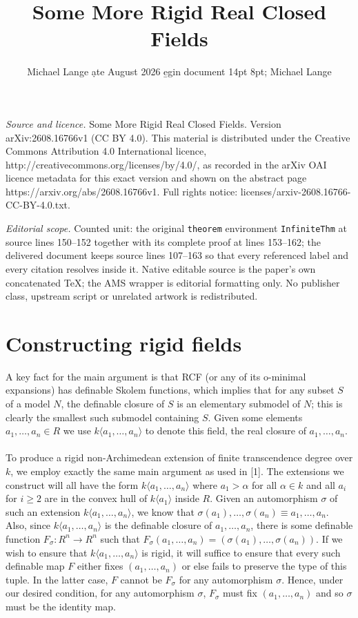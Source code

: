 \documentclass[10pt,a4paper]{amsart}
\begin{document}
\title[Some More Rigid Real Closed Fields]{Some More Rigid Real Closed Fields}
\author{Michael Lange ạte August 2026 e̱gin document 14pt 8pt; Michael Lange}
\date{}
\maketitle
\noindent\emph{Source and licence.} Some More Rigid Real Closed Fields. Version arXiv:2608.16766v1 (CC BY 4.0). This material is distributed under the Creative Commons Attribution 4.0 International licence, http://creativecommons.org/licenses/by/4.0/, as recorded in the arXiv OAI licence metadata for this exact version and shown on the abstract page https://arxiv.org/abs/2608.16766v1. Full rights notice: licenses/arxiv-2608.16766-CC-BY-4.0.txt.\par\smallskip
\noindent\textit{Editorial scope.} Counted unit: the original \texttt{theorem} environment \texttt{InfiniteThm} at source lines 150--152 together with its complete proof at lines 153--162; the delivered document keeps source lines 107--163 so that every referenced label and every citation resolves inside it. Native editable source is the paper's own concatenated TeX; the AMS wrapper is editorial formatting only. No publisher class, upstream script or unrelated artwork is redistributed.
\section{Constructing rigid fields}
A key fact for the main argument is that RCF (or any of its o-minimal expansions) has definable Skolem functions, which implies that for any subset $S$ of a model $N$, the definable closure of $S$ is an elementary submodel of $N$; this is clearly the smallest such submodel containing $S$. Given some elements $a_1,\dots,a_n\in R$ we use $k\langle a_1,\dots,a_n\rangle$ to denote this field, the real closure of $a_1,\dots,a_n$.
\\
\\
To produce a rigid non-Archimedean extension of finite transcendence degree over $k$, we employ exactly the same main argument as used in [1]. The extensions we construct will all have the form $k\langle a_1,\dots, a_n\rangle$ where $a_1>\alpha$ for all $\alpha\in k$ and all $a_i$ for $i\geq 2$ are in the convex hull of $k\langle a_1\rangle$ inside $R$. Given an automorphism $\sigma$ of such an extension $k\langle a_1,\dots, a_n\rangle$, we know that $\sigma(a_1),\dots,\sigma(a_n)\equiv a_1,\dots, a_n$. Also, since $k\langle a_1,\dots, a_n\rangle$ is the definable closure of $a_1,\dots,a_n$, there is some definable function $F_\sigma:R^n\to R^n$ such that $F_\sigma(a_1,\dots,a_n)=(\sigma(a_1),\dots,\sigma(a_n))$. If we wish to ensure that $k\langle a_1,\dots, a_n\rangle$ is rigid, it will suffice to ensure that every such definable map $F$ either fixes $(a_1,\dots,a_n)$ or else fails to preserve the type of this tuple. In the latter case, $F$ cannot be $F_\sigma$ for any automorphism $\sigma$. Hence, under our desired condition, for any automorphism $\sigma$, $F_\sigma$ must fix $(a_1,\dots,a_n)$ and so $\sigma$ must be the identity map.
\end{document}
